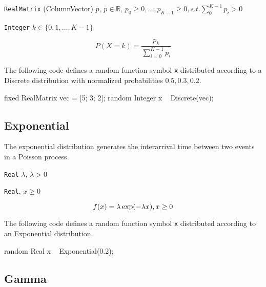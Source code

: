 \begin{itemize*}
\item[] \verb|RealMatrix| (ColumnVector) $\bar{p}$, $\bar{p} \in \mathbb{R}$, $p_{0} \geq 0, \ldots, p_{K-1} \geq 0, s.t. \sum_{0}^{K-1} p_{i} > 0$
\end{itemize*}

\begin{itemize*}
\item[] \verb|Integer| $k \in \{0, 1, \ldots, K-1 \}$
\end{itemize*}

\[
	P(X = k) = \frac{p_{k}}{\sum_{i=0}^{K -1} p_{i}}
\]

The following code defines a random function symbol \verb|x| distributed according to a Discrete distribution with normalized probabilities $0.5, 0.3, 0.2$.
\begin{blogcode}
fixed RealMatrix vec = [5; 3; 2];
random Integer x ~ Discrete(vec);
\end{blogcode}

\subsection{Exponential}
The exponential distribution generates the interarrival time between two events in a Poisson process.

\begin{itemize*}
\item[] \verb|Real|
 $\lambda$, $\lambda > 0$
\end{itemize*}
\begin{itemize*}
\item[] \verb|Real|, $x \geq 0$
\end{itemize*}

\[
	f(x) = \lambda \exp(-\lambda x) , x \geq 0 \\
\]

The following code defines a random function symbol \verb|x| distributed according to an Exponential distribution.
\begin{blogcode}
random Real x ~ Exponential(0.2);
\end{blogcode}

\subsection{Gamma}

